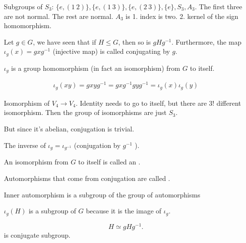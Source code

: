 \documentclass[class=article,crop=false]{standalone}
\begin{document}
\begin{eg}[]
	Subgroups of $ S_3$: $ \{e, (1\ 2)\}, \{e,(1\ 3)\}, \{e,(2\ 3)\}, \{e\}, S_3, A_3$. The first three are not normal. The rest are normal. $ A_3$ is 1. index is two. 2. kernel of the sign homomorphism. 
\end{eg}

Let $ g \in G$, we have seen that if $ H \leq G$, then so is  $ gHg^{-1}$. Furthermore, the map $ \iota_g (x) = gxg^{-1}$ (injective map) is called conjugating by $ g$.  
\begin{prop}[]
	$ \iota_g$ is a group homomorphism (in fact an isomorphism) from  $ G$ to itself.
\end{prop}
\begin{prf}
\begin{align*}
	\iota_g(xy)=gxyg^{-1} = gxg^{-1}gyg^{-1}=\iota_g(x) \iota_g(y)
\end{align*}
\end{prf}
\begin{eg}[]
Isomorphism of $ V_4 \to V_4$. Identity needs to go to itself, but there are 3! different isomorphism. Then the group of isomorphisms are just $ S_3$. 

But since it's abelian, conjugation is trivial.
\end{eg}

\begin{claim}[]
	The inverse of $ \iota_g = \iota_{g^{-1}}$ (conjugation by  $ g^{-1}$ ).
\end{claim}

\begin{defn}[automorphism]
An isomorphism from $ G$ to itself is called an  . 
\end{defn}

\begin{defn}
Automorphisms that come from conjugation are called . 
\end{defn}
\begin{note}[]
Inner automorphism is a subgroup of the group of automorphisms
\end{note}

\begin{note}[]
	$ \iota_g(H)$ is a subgroup of  $ G$ because it is the image of  $ \iota_g$.
\end{note}
\begin{defn}[]
\[
H \simeq gH g^{-1}
.\] 
is conjugate subgroup.
\end{defn}
\end{document}
